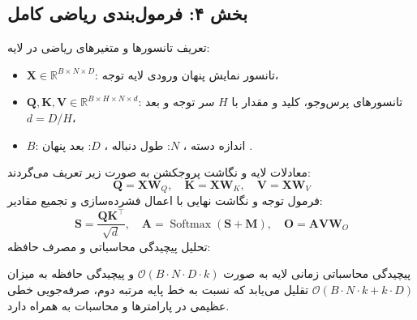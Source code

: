 \subsection*{بخش ۴: فرمول‌بندی ریاضی کامل }
تعریف تانسورها و متغیرهای ریاضی در لایه:
\begin{itemize}
    \item $\mathbf{X} \in \mathbb{R}^{B \times N \times D}$: تانسور نمایش پنهان ورودی لایه توجه،
    \item $\mathbf{Q}, \mathbf{K}, \mathbf{V} \in \mathbb{R}^{B \times H \times N \times d}$: تانسورهای پرس‌وجو، کلید و مقدار با $H$ سر توجه و بعد $d = D/H$،
    \item $B$: اندازه دسته ، $N$: طول دنباله ، $D$: بعد پنهان .
\end{itemize}
معادلات لایه و نگاشت پروجکشن به صورت زیر تعریف می‌گردند:
\begin{equation}
\mathbf{Q} = \mathbf{X} \mathbf{W}_Q, \quad \mathbf{K} = \mathbf{X} \mathbf{W}_K, \quad \mathbf{V} = \mathbf{X} \mathbf{W}_V
\end{equation}
فرمول توجه و نگاشت نهایی با اعمال فشرده‌سازی و تجمیع مقادیر:
\begin{equation}
\mathbf{S} = \frac{\mathbf{Q} \mathbf{K}^\top}{\sqrt{d}}, \quad \mathbf{A} = \operatorname{Softmax}\left( \mathbf{S} + \mathbf{M} \right), \quad \mathbf{O} = \mathbf{A} \mathbf{V} \mathbf{W}_O
\end{equation}
تحلیل پیچیدگی محاسباتی و مصرف حافظه:

پیچیدگی محاسباتی زمانی لایه به صورت $\mathcal{O}(B \cdot N \cdot D \cdot k)$ و پیچیدگی حافظه به میزان $\mathcal{O}(B \cdot N \cdot k + k \cdot D)$ تقلیل می‌یابد که نسبت به خط پایه مرتبه دوم، صرفه‌جویی خطی عظیمی در پارامترها و محاسبات به همراه دارد.

